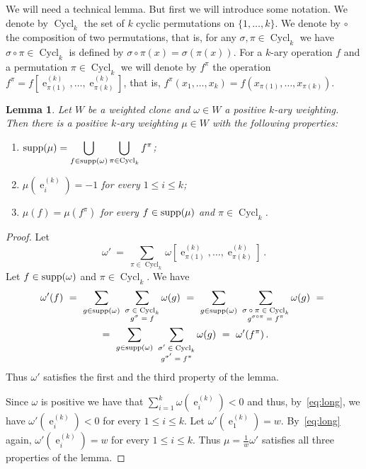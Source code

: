 \documentclass[11pt, reqno]{article}
\DeclareMathOperator{\proj}{\ensuremath{e}}
\DeclareMathOperator{\supp}{{\rm supp}}
\DeclareMathOperator{\perm}{Cycl}
\newtheorem{lemma}{Lemma} %
\theoremstyle{remark}
\begin{document}
We will need a technical lemma. But first we will introduce some notation. We denote by
$\perm_k$ the set of $k$ cyclic permutations on $\{1,\ldots,k\}$. We denote by $\circ$ the
composition of two permutations, that is, for any $\sigma,\pi\in\perm_k$ we have
$\sigma\circ\pi\in\perm_k$ is defined by $\sigma\circ\pi(x)=\sigma(\pi(x))$. For a $k$-ary operation
$f$ and a permutation $\pi\in\perm_k$ we will denote by $f^\pi$ the
operation $f^\pi=f[\proj^{(k)}_{\pi(1)},\ldots,\proj^{(k)}_{\pi(k)}]$, that is,
$f^\pi(x_1,\ldots,x_k)=f(x_{\pi(1)},\ldots,x_{\pi(k)})$.

\begin{lemma}\label{lem:perm}
Let $W$ be a weighted clone and $\omega\in W$ a positive $k$-ary weighting. Then there
is a positive $k$-ary weighting $\mu\in W$ with the following properties:
%
\begin{enumerate}
\item $\displaystyle\supp(\mu)=\bigcup_{f\in\supp(\omega)}\bigcup_{\pi\in\perm_k} f^\pi$;
\item $\mu(\proj^{(k)}_i)=-1$ for every $1\leq i\leq k$; 
\item $\mu(f)=\mu(f^\pi)$ for every $f\in\supp(\mu)$ and
$\pi\in\perm_k$.
\end{enumerate}
\end{lemma}
 
\begin{proof}
Let 
%
\begin{equation}\label{ineq:trick}
\omega'\ =\
\sum_{\pi\in\perm_k}\omega[\proj^{(k)}_{\pi(1)},\ldots,\proj^{(k)}_{\pi(k)}]\,.
\end{equation}
%
Let $f\in\supp(\omega)$ and
$\pi\in\perm_k$. We have
%
\begin{multline}\label{eq:long}
\omega'(f)\ =\
\sum_{g\in\supp(\omega)}\
\sum_{\substack{\text{$\sigma\in\perm_k$}\\\text{$g^{\sigma}=f$}}}\omega(g)
\ =\ 
\sum_{g\in\supp(\omega)}\
\sum_{\substack{\text{$\sigma\circ\pi\in\perm_k$}\\\text{$g^{\sigma\circ\pi}=f^\pi$}}}\omega(g)
\ =\ \\
\ =\ 
\sum_{g\in\supp(\omega)}\
\sum_{\substack{\text{$\sigma'\in\perm_k$}\\\text{$g^{\sigma'}=f^\pi$}}}\omega(g)
\ = \ 
\omega'(f^\pi)\,.
\end{multline}
%
Thus $\omega'$ satisfies the first and the third property of the lemma. 

Since $\omega$ is positive we have that $\sum_{i=1}^k\omega(\proj^{(k)}_i)<0$
and thus, by~\eqref{eq:long}, we have $\omega'(\proj^{(k)}_i)<0$ for every
$1\leq i\leq k$. Let $\omega'(\proj^{(k)}_1)=w$. By~\eqref{eq:long} again,
$\omega'(\proj^{(k)}_i)=w$ for every $1\leq i\leq k$. Thus
$\mu=\frac{1}{w}\omega'$ satisfies all three properties of the lemma.
%
\end{proof}
\end{document}
